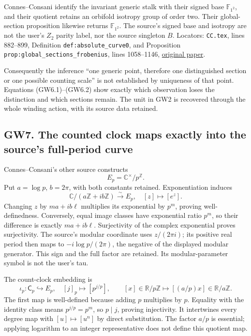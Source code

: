 Connes--Consani identify the invariant generic stalk with their signed
base \(\mathbb F_{1^2}\), and their quotient retains an orbifold
isotropy group of order two. Their global-section proposition likewise
returns \(\mathbb F_{1^2}\). The source's signed base and isotropy are
not the user's \(Z_2\) parity label, nor the source singleton \(B\).
Locators: \nolinkurl{CC.tex}, lines 882--899, Definition
\texttt{def:absolute\_curve0}, and Proposition
\texttt{prop:global\_sections\_frobenius}, lines 1058--1146,
\href{https://arxiv.org/html/2609.00299v1}{original paper}.

Consequently the inference ``one generic point, therefore one
distinguished section or one possible counting scale'' is not
established by uniqueness of that point. Equations (GW6.1)--(GW6.2) show
exactly which observation loses the distinction and which sections
remain. The unit in GW2 is recovered through the whole winding action,
with its source data retained.

\subsection{GW7. The counted clock maps exactly into the source's
full-period
curve}\label{gw20260924-gw7.-the-counted-clock-maps-exactly-into-the-sources-full-period-curve}

Connes--Consani's other source constructs \[
E_p=\mathbb C^\times/p^{\mathbb Z}.
\] Put \(a=\log p\), \(b=2\pi\), with both constants retained.
Exponentiation induces \[
\mathbb C/(a\mathbb Z+ib\mathbb Z)\xrightarrow{\sim}E_p,
\quad[z]\longmapsto[e^z].
\tag{GW7.1}
\] Changing \(z\) by \(ma+ib\ell\) multiplies its exponential by
\(p^m\), proving well-definedness. Conversely, equal image classes have
exponential ratio \(p^m\), so their difference is exactly \(ma+ib\ell\).
Surjectivity of the complex exponential proves surjectivity. The
source's modular coordinate uses \(z/(2\pi i)\); its positive real
period then maps to \(-i\log p/(2\pi)\), the negative of the displayed
modular generator. This sign and the full factor are retained. Its
modular-parameter symbol is not the user's tau.

The count-clock embedding is \[
\iota_p:\mathsf C_p\hookrightarrow E_p,
\quad[j]_p\longmapsto[p^{j/p}],
\qquad
[x]\in\mathbb R/p\mathbb Z\longmapsto[(a/p)x]\in\mathbb R/a\mathbb Z.
\tag{GW7.2}
\] The first map is well-defined because adding \(p\) multiplies by
\(p\). Equality with the identity class means \(p^{j/p}=p^m\), so
\(p\mid j\), proving injectivity. It intertwines every degree map with
\([u]\mapsto[u^n]\) by direct substitution. The factor \(a/p\) is
essential; applying logarithm to an integer representative does not
define this quotient map.

